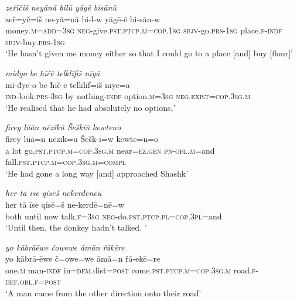 \ea \label{HB.22}
\textit{zeřīčiš neyānā bilū yāgē bisānū} \\ 
\gll zeř=yč=iš ne-yā=nā bi-l-w yāgē-ē bi-sān-w \\ 
 money\textsc{.m}\textsc{=add}\textsc{=3sg} \textsc{neg-}give\textsc{.pst}\textsc{.ptcp}\textsc{.m}\textsc{=cop}\textsc{.1sg} \textsc{sbjv-}go\textsc{.prs}\textsc{-1sg} place\textsc{\textsc{.f}}\textsc{-indf} \textsc{sbjv-}buy\textsc{.prs}\textsc{-1sg} \\ 
\glt `He hasn’t given me money either so that I could go to a place [and] buy [flour]'
\z 
 
\ea \label{HB.29}
\textit{miđyo be ħīčē telklīfiš nīyā} \\ 
\gll mi-đye-o be ħīč-ē telklīf=iš nīye=ā \\ 
 \textsc{ind-}look\textsc{.prs}\textsc{-3sg} by nothing\textsc{-indf} option\textsc{.m}\textsc{=3sg} \textsc{\textsc{neg.}exist}\textsc{=cop}\textsc{.3sg}\textsc{.m} \\ 
\glt `He realised that he had absolutely no options,'
\z 
 
\ea \label{HB.30}
\textit{firey lūān nēzīkū Šeškīū kewteno} \\ 
\gll firey lūā=n nēzīk=ū Šešk-ī=w kewte=n=o \\ 
 a lot go\textsc{.pst}\textsc{.ptcp}\textsc{.m}\textsc{=cop}\textsc{.3sg}\textsc{.m} near\textsc{=ez}\textsc{.gen} \textsc{pn}\textsc{-obl}\textsc{.m}=and fall\textsc{.pst}\textsc{.ptcp}\textsc{.m}\textsc{=cop}\textsc{.3sg}\textsc{.m}\textsc{=\textsc{compl}} \\ 
\glt `He had gone a long way [and] approached Shashk'
\z 
 
\ea \label{HB.46}
\textit{her tā īse qisēš nekerdēnēū} \\ 
\gll her tā īse qisē=š ne-kerdē=nē=w \\ 
 both until now talk\textsc{\textsc{.f}}\textsc{=3sg} \textsc{neg-}do\textsc{.pst}\textsc{.ptcp}\textsc{.pl}\textsc{=cop}\textsc{.3pl}=and \\ 
\glt `Until then, the donkey hadn’t talked. '
\z 
 
\ea \label{HB.49}
\textit{yo kābrāēwe čowewe āmān řākēre} \\ 
\gll yo kābrā-ēwe č=owe=we āmā=n řā-ekē=re \\ 
 one\textsc{.m} man\textsc{-indf} in\textsc{=dem}.dist\textsc{=\textsc{post}} come\textsc{.pst}\textsc{.ptcp}\textsc{.m}\textsc{=cop}\textsc{.3sg}\textsc{.m} road\textsc{\textsc{.f}}\textsc{-def}\textsc{.obl}\textsc{\textsc{.f}}\textsc{=\textsc{post}} \\ 
\glt `A man came from the other direction onto their road'
\z 
 
